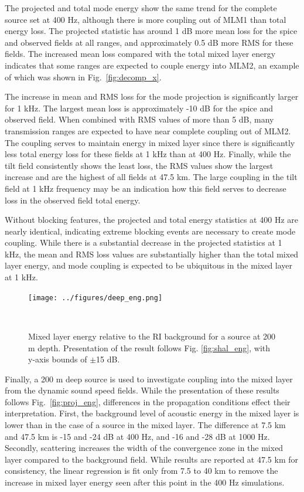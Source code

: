 \documentclass[preprint,NumberedRefs]{JASA}
\begin{document}
The projected and total mode energy show the same trend for the complete source set at 400 Hz, although there is more coupling out of MLM1 than total energy loss. The projected statistic has around 1 dB more mean loss for the spice and observed fields at all ranges, and approximately 0.5 dB more RMS for these fields. The increased mean loss compared with the total mixed layer energy indicates that some ranges are expected to couple energy into MLM2, an example of which was shown in Fig.~\ref{fig:decomp_x}.

The increase in mean and RMS loss for the mode projection is significantly larger for 1 kHz. The largest mean loss is approximately -10 dB for the spice and observed field. When combined with RMS values of more than 5 dB, many transmission ranges are expected to have near complete coupling out of MLM2. The coupling serves to maintain energy in mixed layer since there is significantly less total energy loss for these fields at 1 kHz than at 400 Hz. Finally, while the tilt field consistently shows the least loss, the RMS values show the largest increase and are the highest of all fields at 47.5 km. The large coupling in the tilt field at 1 kHz frequency may be an indication how this field serves to decrease loss in the observed field total energy.

Without blocking features, the projected and total energy statistics at 400 Hz are nearly identical, indicating extreme blocking events are necessary to create mode coupling. While there is a substantial decrease in the projected statistics at 1 kHz, the mean and RMS loss values are substantially higher than the total mixed layer energy, and mode coupling is expected to be ubiquitous in the mixed layer at 1 kHz.

\begin{figure}
\texttt{[image: ../figures/deep\_eng.png]}
    \caption{Mixed layer energy relative to the RI background for a source at 200 m depth. Presentation of the result follows Fig. \ref{fig:shal_eng}, with y-axis bounds of $\pm$15 dB.}
    \label{fig:deep_proj}
\end{figure}
Finally, a 200 m deep source is used to investigate coupling into the mixed layer from the dynamic sound speed fields. While the presentation of these results follows Fig.~\ref{fig:proj_eng}, differences in the propagation conditions effect their interpretation. First, the background level of acoustic energy in the mixed layer is lower than in the case of a source in the mixed layer. The difference at 7.5 km and 47.5 km is -15 and -24 dB at 400 Hz, and -16 and -28 dB at 1000 Hz. Secondly, scattering increases the width of the convergence zone in the mixed layer compared to the background field. While results are reported at 47.5 km for consistency, the linear regression is fit only from 7.5 to 40 km to remove the increase in mixed layer energy seen after this point in the 400 Hz simulations.
\end{document}

